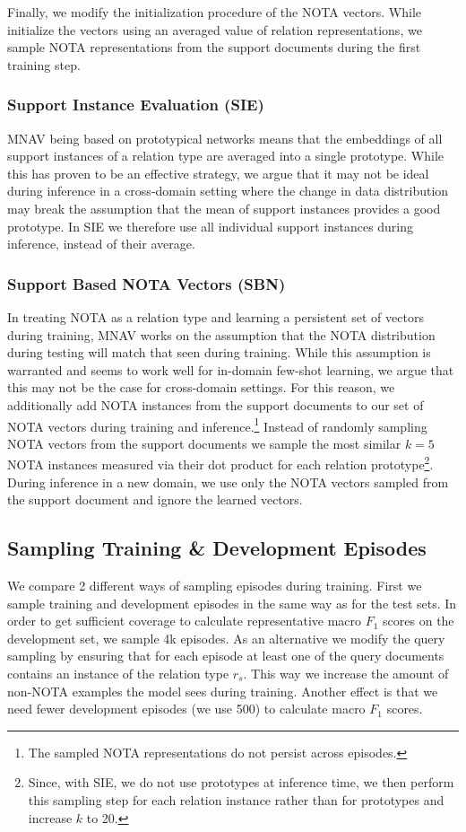 \documentclass[11pt]{article}
\begin{document}
Finally, we modify the initialization procedure of the NOTA vectors. While 
\citet{sabo_revisiting_2021} 
initialize the vectors using an averaged value of relation representations, we sample NOTA representations from the support documents during the first training step.

\subsubsection{Support Instance Evaluation (SIE)}
MNAV being based on prototypical networks \cite{snell_prototypical_2017} means that the embeddings of all support instances of a relation type are averaged into a single prototype.
While this has proven to be an effective strategy, we argue that it may not be ideal during inference in a cross-domain setting where the change in data distribution may break the assumption that the mean of support instances provides a good prototype.
In SIE we therefore use all individual support instances during inference, instead of their average.



\subsubsection{Support Based NOTA Vectors (SBN)}
In treating NOTA as a relation type and learning a persistent set of vectors during training, MNAV works on the assumption that the NOTA distribution during testing will match that seen during training. 
While this assumption is warranted and seems to work well for in-domain few-shot learning, we argue that this may not be the case for cross-domain settings. 
For this reason, we additionally add NOTA instances from the support documents to our set of NOTA vectors during training and inference.\footnote{The sampled NOTA representations do not persist across episodes.} 
Instead of randomly sampling NOTA vectors from the support documents we sample the most similar $k=5$ NOTA instances measured via their dot product for each relation prototype\footnote{Since, with SIE, we do not use prototypes at inference time, we then perform this sampling step for each relation instance rather than for prototypes and increase $k$ to 20.}.
During inference in a new domain, we use only the NOTA vectors sampled from the support document and ignore the learned vectors.

\subsection{Sampling Training \& Development Episodes}
\label{sec:train-sampling}
We compare 2 different ways of sampling episodes during training.
First we sample training and development episodes in the same way as for the test sets.
In order to get sufficient coverage to calculate representative macro $F_1$ scores on the development set, we sample 4k episodes.
As an alternative we modify the query sampling by ensuring that for each episode at least one of the query documents contains an instance of the relation type $r_s$.
This way we increase the amount of non-NOTA examples the model sees during training.
Another effect is that we need fewer development episodes (we use 500) to calculate macro $F_1$ scores.
\end{document}
